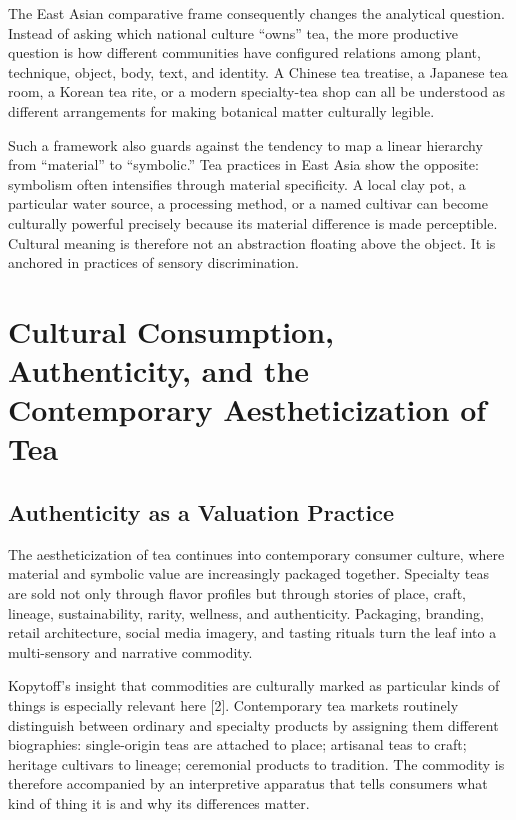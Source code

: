 \documentclass[11pt,a4paper]{article}
\begin{document}
The East Asian comparative frame consequently changes the analytical question. Instead of asking which national culture ``owns'' tea, the more productive question is how different communities have configured relations among plant, technique, object, body, text, and identity. A Chinese tea treatise, a Japanese tea room, a Korean tea rite, or a modern specialty-tea shop can all be understood as different arrangements for making botanical matter culturally legible.

Such a framework also guards against the tendency to map a linear hierarchy from ``material'' to ``symbolic.'' Tea practices in East Asia show the opposite: symbolism often intensifies through material specificity. A local clay pot, a particular water source, a processing method, or a named cultivar can become culturally powerful precisely because its material difference is made perceptible. Cultural meaning is therefore not an abstraction floating above the object. It is anchored in practices of sensory discrimination.

\section{Cultural Consumption, Authenticity, and the Contemporary Aestheticization of Tea}

\subsection{Authenticity as a Valuation Practice}

The aestheticization of tea continues into contemporary consumer culture, where material and symbolic value are increasingly packaged together. Specialty teas are sold not only through flavor profiles but through stories of place, craft, lineage, sustainability, rarity, wellness, and authenticity. Packaging, branding, retail architecture, social media imagery, and tasting rituals turn the leaf into a multi-sensory and narrative commodity.

Kopytoff's insight that commodities are culturally marked as particular kinds of things is especially relevant here [2]. Contemporary tea markets routinely distinguish between ordinary and specialty products by assigning them different biographies: single-origin teas are attached to place; artisanal teas to craft; heritage cultivars to lineage; ceremonial products to tradition. The commodity is therefore accompanied by an interpretive apparatus that tells consumers what kind of thing it is and why its differences matter.
\end{document}
